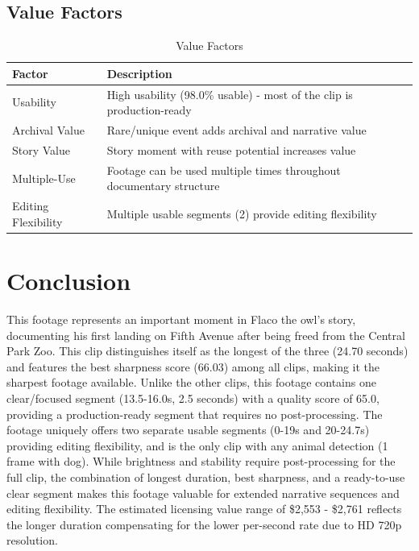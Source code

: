 \documentclass[
  11pt,
]{article}
\begin{document}
\needspace{12cm}
\subsection{Value Factors}

\begin{table}[h]
\centering
\small
\caption{Value Factors}
\label{tab-value-factors}
\begin{tabular}{p{3cm}p{7cm}}
\toprule
\textbf{Factor} & \textbf{Description} \\
\midrule
Usability & High usability (98.0\% usable) - most of the clip is production-ready \\
Archival Value & Rare/unique event adds archival and narrative value \\
Story Value & Story moment with reuse potential increases value \\
Multiple-Use & Footage can be used multiple times throughout documentary structure \\
Editing Flexibility & Multiple usable segments (2) provide editing flexibility \\
\bottomrule
\end{tabular}
\end{table}

\section{Conclusion}

This footage represents an important moment in Flaco the owl's story,
documenting his first landing on Fifth Avenue after being freed from the
Central Park Zoo. This clip distinguishes itself as the longest of the
three (24.70 seconds) and features the best sharpness score (66.03)
among all clips, making it the sharpest footage available. Unlike the
other clips, this footage contains one clear/focused segment
(13.5-16.0s, 2.5 seconds) with a quality score of 65.0, providing a
production-ready segment that requires no post-processing. The footage
uniquely offers two separate usable segments (0-19s and 20-24.7s)
providing editing flexibility, and is the only clip with any animal
detection (1 frame with dog). While brightness and stability require
post-processing for the full clip, the combination of longest duration,
best sharpness, and a ready-to-use clear segment makes this footage
valuable for extended narrative sequences and editing flexibility. The
estimated licensing value range of \$2,553 - \$2,761 reflects the longer
duration compensating for the lower per-second rate due to HD 720p
resolution.
\end{document}
